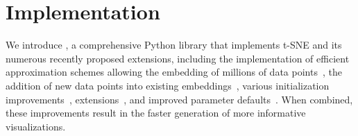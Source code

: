 \documentclass[article]{jss}
\newcommand{\opentsne}{\pkg{openTSNE}}
\begin{document}
\section{Implementation} \label{sec:implementation}

We introduce \opentsne, a comprehensive Python library that implements t-SNE and its numerous recently proposed extensions, including the implementation of efficient approximation schemes allowing the embedding of millions of data points~\citep{van2014accelerating,linderman2019fast}, the addition of new data points into existing embeddings~\citep{policar2019embedding}, various initialization improvements~\citep{kobak2019umap}, extensions~\citep{kobak2019heavy,kobak2019art}, and improved parameter defaults~\citep{belkina2019automated}. When combined, these improvements result in the faster generation of more informative visualizations.
\end{document}
